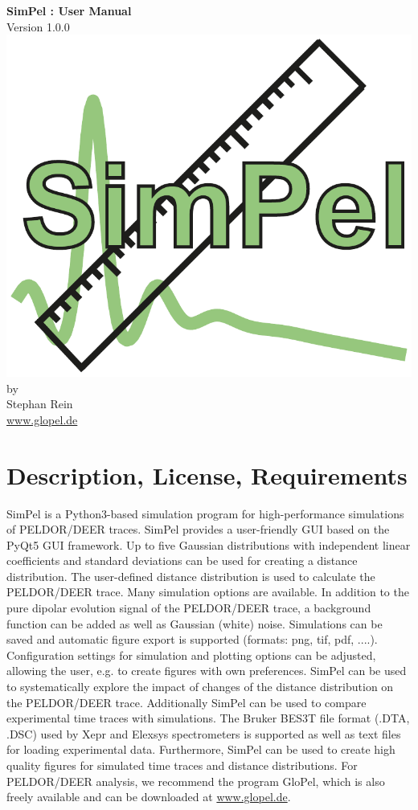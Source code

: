 \documentclass[pdftex,bezier,german,a4,twoside, headexclude,12pt,nochapterprefix, titlepage]{extarticle}
\newcommand{\simpel}{\textsf{SimPel} }
\begin{document}
\thispagestyle{empty}
\begin{center}
\textbf{\Large \simpel: User Manual}\\[1.5cm]
{\large Version 1.0.0} \\[1.5cm]
\includegraphics[scale=0.65]{SimPel_Logo.pdf}\\[2cm]
by \\[0.5cm]
{\Large Stephan Rein}\\[1cm]
{\large \url{www.glopel.de}}
\end{center}
\newpage


\section{Description, License, Requirements}
\simpel is a Python3-based simulation program for high-performance simulations of PELDOR/DEER traces. \simpel provides a user-friendly GUI based on the PyQt5 GUI framework.
Up to five Gaussian distributions with independent
linear coefficients and standard deviations can be used for creating a distance distribution. The user-defined distance distribution
is used to calculate the PELDOR/DEER trace. Many simulation options are available. In addition to the pure dipolar evolution signal of the PELDOR/DEER trace, a background function
can be added as well as Gaussian (white) noise. Simulations can be saved and automatic figure export is supported (formats: png, tif, pdf, ....).
Configuration settings for simulation and plotting options can be adjusted, allowing the user, e.g. to create figures with own preferences.
\simpel can be used to systematically explore the impact of changes of the distance distribution on the PELDOR/DEER trace.
Additionally \simpel can be used to compare experimental time traces with simulations.
The Bruker BES3T file format (.DTA, .DSC) used by Xepr and Elexsys spectrometers
is supported as well as text files for loading experimental data. Furthermore, \simpel can be used to create high quality figures for 
simulated time traces and distance distributions.
For PELDOR/DEER analysis, we recommend the program GloPel, which is also freely available and can be downloaded at {\url{www.glopel.de}}.
\end{document}
